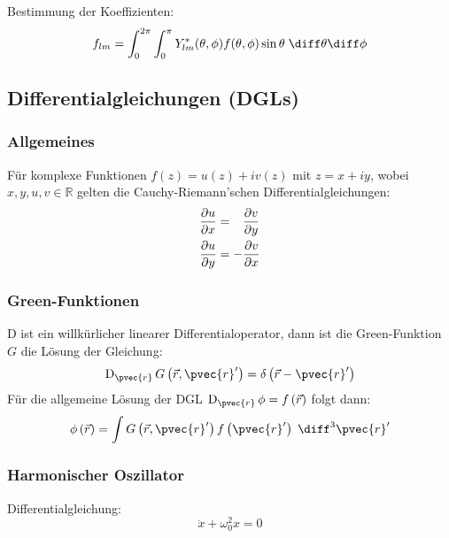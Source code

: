 \documentclass[11pt]{article}
\numberwithin{equation}{section}
\begin{document}
        Bestimmung der Koeffizienten:
        \begin{equation}
          f_{lm} = \int_0^{2\pi} \int_0^\pi Y_{lm}^{*}(\theta,\phi) f(\theta,\phi) \sin\theta\;\diff\theta\diff\phi
        \end{equation}

    \subsection{Differentialgleichungen (DGLs)}
      \subsubsection{Allgemeines}
        Für komplexe Funktionen $f(z)=u(z)+iv(z)$ mit $z=x+iy$, wobei $x,y,u,v\in\mathbb{R}$ gelten die Cauchy-Riemann'schen Differentialgleichungen:
        \begin{equation}
          \begin{aligned}
            \frac{\partial u}{\partial x} &= \phantom{-}\frac{\partial v}{\partial y} \\
            \frac{\partial u}{\partial y} &= -\frac{\partial v}{\partial x} \\
          \end{aligned}
        \end{equation}


      \subsubsection{Green-Funktionen}
        $\mathrm{D}$ ist ein willkürlicher linearer Differentialoperator, dann ist die Green-Funktion $G$ die Lösung der Gleichung:
        \begin{equation}
          \mathrm{D}_{\pvec{r}}\, G\left(\vec{r},\pvec{r}'\right) = \delta\left(\vec{r} - \pvec{r}'\right)
        \end{equation}
        Für die allgemeine Lösung der DGL $\mathrm{D}_{\pvec{r}}\, \phi = f\left(\vec{r}\right)$ folgt dann:
        \begin{equation}
          \phi\left(\vec{r}\right) = \int G\left(\vec{r},\pvec{r}'\right)f\left(\pvec{r}'\right)\;\diff^3\pvec{r}'
        \end{equation}

      \subsubsection{Harmonischer Oszillator}
        Differentialgleichung:
        \begin{equation}
          \ddot{x}+\omega_0^2 x = 0
        \end{equation}
\end{document}
